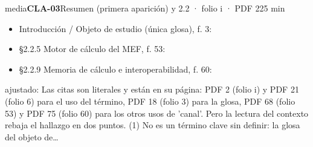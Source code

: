 \begin{ficha}{media}{\casilla\textbf{CLA-03}\quad{}\quad Resumen (primera aparición) y 2.2 · folio i · PDF 2\hfill 25 min}
\begin{itemize}[leftmargin=1.2em,itemsep=1pt,topsep=1pt]
\item {\small Introducción /\allowbreak{} Objeto de estudio (única glosa), f. 3: }
\item {\small §2.2.5 Motor de cálculo del MEF, f. 53: }
\item {\small §2.2.9 Memoria de cálculo e interoperabilidad, f. 60: }
\end{itemize}
{\footnotesize\color{gris}ajustado: Las citas son literales y están en su página: PDF 2 (folio i) y PDF 21 (folio 6) para el uso del término, PDF 18 (folio 3) para la glosa, PDF 68 (folio 53) y PDF 75 (folio 60) para los otros usos de 'canal'. Pero la lectura del contexto rebaja el hallazgo en dos puntos. (1) No es un término clave sin definir: la glosa del objeto de…\par}
\end{ficha}

